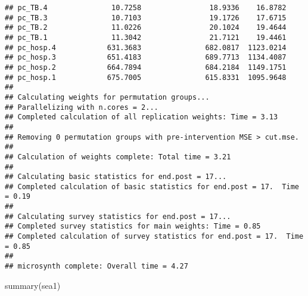 \documentclass[
]{article}
\newenvironment{Shaded}{\begin{snugshade}}{\end{snugshade}}
\newcommand{\FunctionTok}[1]{\textcolor[rgb]{0.00,0.00,0.00}{#1}}
\newcommand{\NormalTok}[1]{#1}
\begin{document}
\begin{verbatim}
## pc_TB.4               10.7258                18.9336    16.8782
## pc_TB.3               10.7103                19.1726    17.6715
## pc_TB.2               11.0226                20.1024    19.4644
## pc_TB.1               11.3042                21.7121    19.4461
## pc_hosp.4            631.3683               682.0817  1123.0214
## pc_hosp.3            651.4183               689.7713  1134.4087
## pc_hosp.2            664.7894               684.2184  1149.1751
## pc_hosp.1            675.7005               615.8331  1095.9648
## 
## Calculating weights for permutation groups...
## Parallelizing with n.cores = 2...
## Completed calculation of all replication weights: Time = 3.13
## 
## Removing 0 permutation groups with pre-intervention MSE > cut.mse.
## 
## Calculation of weights complete: Total time = 3.21
## 
## Calculating basic statistics for end.post = 17...
## Completed calculation of basic statistics for end.post = 17.  Time = 0.19
## 
## Calculating survey statistics for end.post = 17...
## Completed survey statistics for main weights: Time = 0.85
## Completed calculation of survey statistics for end.post = 17.  Time = 0.85
## 
## microsynth complete: Overall time = 4.27
\end{verbatim}

\begin{Shaded}
\begin{Highlighting}[]
\FunctionTok{summary}\NormalTok{(sea1)}
\end{Highlighting}
\end{Shaded}
\end{document}
